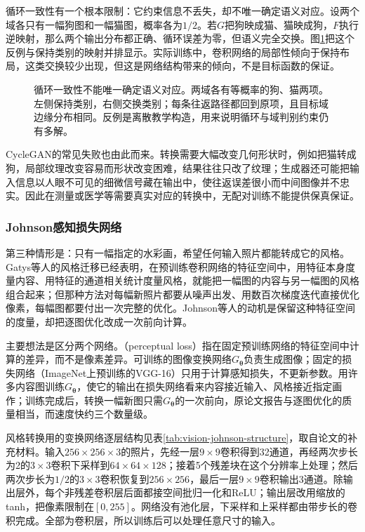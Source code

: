 循环一致性有一个根本限制：它约束信息不丢失，却不唯一确定语义对应。设两个域各只有一幅狗图和一幅猫图，概率各为$1/2$。若$G$把狗映成猫、猫映成狗，$F$执行逆映射，那么两个输出分布都正确、循环误差为零，但语义完全交换。图\ref{fig:vision-cycle-ambiguity}把这个反例与保持类别的映射并排显示。实际训练中，卷积网络的局部性倾向于保持布局，这类交换较少出现，但这是网络结构带来的倾向，不是目标函数的保证。

\begin{figure}[htbp]
 \centering
 
 \caption{循环一致性不能唯一确定语义对应。两域各有等概率的狗、猫两项。左侧保持类别，右侧交换类别；每条往返路径都回到原项，且目标域边缘分布相同。反例是离散教学构造，用来说明循环与域判别约束仍有多解。}
 \label{fig:vision-cycle-ambiguity}
\end{figure}

CycleGAN的常见失败也由此而来。转换需要大幅改变几何形状时，例如把猫转成狗，局部纹理改变容易而形状改变困难，结果往往只改了纹理；生成器还可能把输入信息以人眼不可见的细微信号藏在输出中，使往返误差很小而中间图像并不忠实。因此在测量或医学等需要真实对应的转换中，无配对训练不能提供保真保证。

\subsubsection{Johnson感知损失网络}
\label{sec:vision-generation-perceptual-style}

第三种情形是：只有一幅指定的水彩画，希望任何输入照片都能转成它的风格。Gatys等人的风格迁移已经表明，在预训练卷积网络的特征空间中，用特征本身度量内容、用特征的通道相关统计度量风格，就能把一幅图的内容与另一幅图的风格组合起来；但那种方法对每幅新照片都要从噪声出发、用数百次梯度迭代直接优化像素，每幅图都要付出一次完整的优化。Johnson等人的动机是保留这种特征空间的度量，却把逐图优化改成一次前向计算。

主要想法是区分两个网络。（perceptual loss）指在固定预训练网络的特征空间中计算的差异，而不是像素差异。可训练的图像变换网络$G_{\bm{\theta}}$负责生成图像；固定的损失网络（ImageNet上预训练的VGG-16）只用于计算感知损失，不更新参数。用许多内容图训练$G_{\bm{\theta}}$，使它的输出在损失网络看来内容接近输入、风格接近指定画作；训练完成后，转换一幅新图只需$G_{\bm{\theta}}$的一次前向，原论文报告与逐图优化的质量相当，而速度快约三个数量级。

风格转换用的变换网络逐层结构见表\ref{tab:vision-johnson-structure}，取自论文的补充材料。输入$256\times256\times3$的照片，先经一层$9\times9$卷积得到32通道，再经两次步长为2的$3\times3$卷积下采样到$64\times64\times128$；接着5个残差块在这个分辨率上处理；然后两次步长为$1/2$的$3\times3$卷积恢复到$256\times256$，最后一层$9\times9$卷积输出3通道。除输出层外，每个非残差卷积层后面都接空间批归一化和ReLU；输出层改用缩放的tanh，把像素限制在$[0,255]$。网络没有池化层，下采样和上采样都由带步长的卷积完成。全部为卷积层，所以训练后可以处理任意尺寸的输入。

